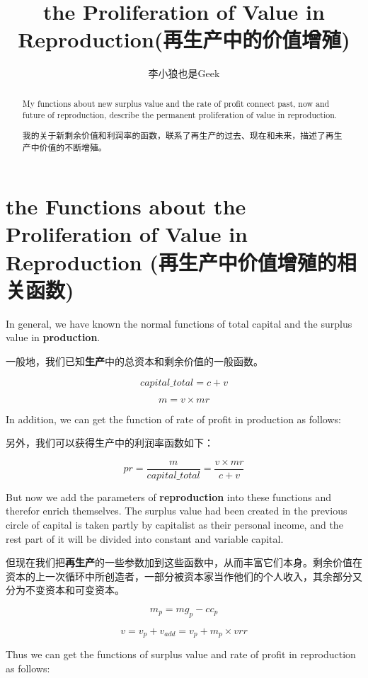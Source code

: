 \documentclass[]{ctexart}
\title{the Proliferation of Value in Reproduction\newline (再生产中的价值增殖)}
\author{李小狼也是Geek}
\begin{document}
\maketitle

\begin{abstract}

My functions about new surplus value and the rate of profit connect past, now and future of reproduction, describe the permanent proliferation of value in reproduction.

我的关于新剩余价值和利润率的函数，联系了再生产的过去、现在和未来，描述了再生产中价值的不断增殖。

\end{abstract}

\section{the Functions about the Proliferation of Value in Reproduction (再生产中价值增殖的相关函数)}

In general, we have known the normal functions of total capital and the surplus value in \textbf{production}.

一般地，我们已知\textbf{生产}中的总资本和剩余价值的一般函数。

$$capital\_total = c + v$$

$$m = v \times mr$$

In addition, we can get the function of rate of profit in production as follows:

另外，我们可以获得生产中的利润率函数如下：

$$pr = \frac{m}{capital\_total} = \frac{v \times mr}{c + v}$$

But now we add the parameters of \textbf{reproduction} into these functions and therefor enrich themselves. The surplus value had been created in the previous circle of capital is taken partly by capitalist as their personal income, and the rest part of it will be divided into constant and variable capital. 

但现在我们把\textbf{再生产}的一些参数加到这些函数中，从而丰富它们本身。剩余价值在资本的上一次循环中所创造者，一部分被资本家当作他们的个人收入，其余部分又分为不变资本和可变资本。

$$m_p = mg_p - cc_p$$

$$v = v_p + v_{add} = v_p + m_p \times vrr$$

Thus we can get the functions of surplus value and rate of profit in reproduction as follows:
\end{document}
